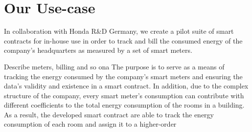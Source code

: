 
\section{Our Use-case}\label{usecase}
In collaboration with Honda R\&D Germany, we create a pilot suite of smart contracts for in-house use in order to track and bill the consumed energy of the company's headquarters as measured by a set of smart meters. 

Describe meters, billing and so ona
The purpose is to serve as a means of tracking the energy consumed by the company's smart meters and ensuring the data's validity and existence in a smart contract. In addition, due to the complex structure of the company, every smart meter's consumption can contribute with different coefficients to the total energy consumption of the rooms in a building. As a result, the developed smart contract are able to track the energy consumption of each room and assign it to a higher-order 